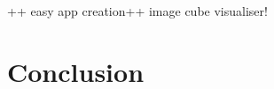 \documentclass{llncs}
\begin{document}
++ easy app creation++ image cube visualiser!


\section{Conclusion}\label{sec:conclusion}






\end{document}

